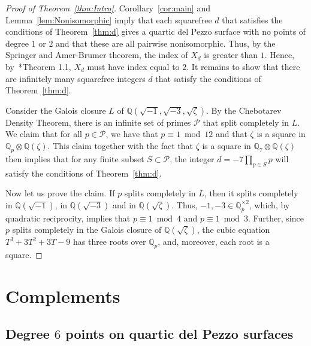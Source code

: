 \documentclass[12pt, reqno]{amsart}
\newtheorem{lemma}{Lemma}
\theoremstyle{definition}
\newcommand{\Q}{{\mathbb Q}}
\newcommand{\calP}{{\mathcal P}}
\begin{document}
\begin{proof}[Proof of Theorem~\ref{thm:Intro}]
   Corollary~\ref{cor:main} and Lemma~\ref{lem:Nonisomorphic} imply that each squarefree \(d\) that satisfies the conditions of Theorem~\ref{thm:d} gives a quartic del Pezzo surface with no points of degree \(1\) or \(2\) and that these are all pairwise nonisomorphic. Thus, by the Springer and Amer-Brumer theorem, the index of \(X_d\) is greater than \(1\). Hence, by~\cite{CV}*{Theorem 1.1}, \(X_d\) must have index equal to \(2\). It remains to show that there are infinitely many squarefree integers \(d\) that satisfy the conditions of Theorem~\ref{thm:d}. 
   
   Consider the Galois closure \(L\) of \(\Q(\sqrt{-1}, {\sqrt{-3}},\sqrt{\zeta})\). By the Chebotarev Density Theorem, there is an infinite set of primes \(\calP\) that split completely in \(L\).  We claim that for all \(p\in \calP\), we have that \(p\equiv 1 \bmod 12\) and that \(\zeta\) is a square in \(\Q_p\otimes \Q(\zeta)\).  This claim together with the fact that \(\zeta\) is a square in \(\Q_7\otimes \Q(\zeta)\) then implies that for any finite subset \(S\subset \calP\), the integer \(d = -7\prod_{p\in S}p\) will satisfy the conditions of Theorem~\ref{thm:d}.
   
   Now let us prove the claim. If \(p\) splits completely in \(L\), then it splits completely in \(\Q(\sqrt{-1})\), in \(\Q({\sqrt{-3}})\) and in \(\Q(\sqrt{\zeta})\).  Thus, \(-1, -3\in \Q_p^{\times 2}\), which, by quadratic reciprocity, implies that \(p\equiv 1 \bmod 4\) and \(p\equiv 1 \bmod 3\). Further, since \(p\) splits completely in the Galois closure of \(\Q(\sqrt{\zeta})\), the cubic equation \(T^3 + 3T^2 + 3T - 9\) has three roots over \(\Q_p\), and, moreover, each root is a square.
\end{proof}

\section{Complements}


\subsection{Degree $6$ points on quartic del Pezzo surfaces}\label{sec:Degree6}
\end{document}
